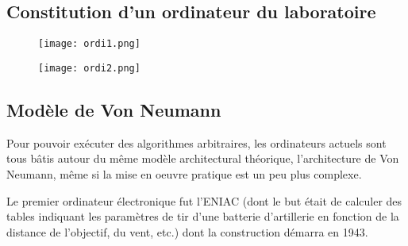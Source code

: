 \subsection{Constitution d’un ordinateur du laboratoire}


\begin{figure}[h]
\begin{minipage}[c]{.49\linewidth}
\begin{center}
\texttt{[image: ordi1.png]}
\label{}
\end{center}
\end{minipage} \hfill
\begin{minipage}[c]{.49\linewidth}
\begin{center}
\texttt{[image: ordi2.png]}
\label{}
\end{center}
\end{minipage}
\end{figure}

\subsection{Modèle de Von Neumann}

Pour pouvoir exécuter des algorithmes arbitraires, les ordinateurs actuels sont tous bâtis
autour du même modèle architectural théorique, l’architecture de Von Neumann, même
si la mise en oeuvre pratique est un peu plus complexe.

Le premier ordinateur électronique fut l’ENIAC
(dont le but était de calculer des tables indiquant les paramètres de tir d’une batterie d’artillerie
en fonction de la distance de l’objectif, du vent, etc.) dont la construction démarra
en 1943. 

